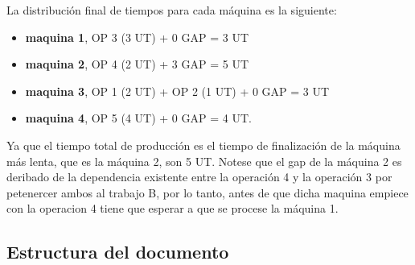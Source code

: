 La distribución final de tiempos para cada máquina es la siguiente: 
\begin{itemize}
    \item \textbf{maquina 1}, OP 3 (3 UT) + 0 GAP = 3 UT 
    \item \textbf{maquina 2}, OP 4 (2 UT) + 3 GAP = 5 UT 
    \item \textbf{maquina 3}, OP 1 (2 UT) + OP 2 (1 UT) + 0 GAP = 3 UT 
    \item \textbf{maquina 4}, OP 5 (4 UT) + 0 GAP = 4 UT. 
\end{itemize}

Ya que el tiempo total de producción es el tiempo de finalización de la máquina más lenta, 
que es la máquina 2, son 5 UT. Notese que el gap de la máquina 2 es deribado de la dependencia
existente entre la operación 4 y la operación 3 por petenercer ambos al trabajo B, 
por lo tanto, antes de que dicha maquina empiece con la operacion 4 tiene que esperar 
a que se procese la máquina 1.

\subsection{Estructura del documento}



\pagebreak